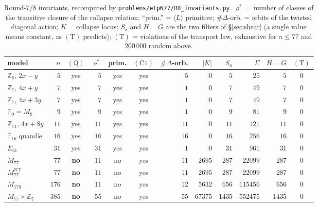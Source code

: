 \documentclass[11pt]{article}
\theoremstyle{plain}
\theoremstyle{definition}
\theoremstyle{remark}
\numberwithin{equation}{section}
\newcommand{\Z}{\mathbb{Z}}
\newcommand{\F}{\mathbb{F}}
\begin{document}
\begin{table}[htbp]
\centering
{\footnotesize
\setlength{\tabcolsep}{4.5pt}
\begin{tabular}{lrcrccrrrrrc}
\toprule
model & $n$ & $(\mathrm{Q})$ & $\varrho^{*}$ & prim. & $(\mathrm{C1})$ &
$\#\Delta$-orb. & $|K|$ & $S_a$ & $\Sigma$ & $H\!=\!G$ & $(\mathrm{T})$\\
\midrule
$\Z_5$, $2x-y$        & $5$   & yes & $5$  & yes & yes & $5$  & $0$    & $5$    & $25$     & $5$    & $0$\\
$\Z_7$, $4x+y$        & $7$   & yes & $7$  & yes & yes & $1$  & $0$    & $7$    & $49$     & $7$    & $0$\\
$\Z_7$, $4x+3y$       & $7$   & yes & $7$  & yes & yes & $1$  & $0$    & $7$    & $49$     & $7$    & $0$\\
$\F_9 = M_9$          & $9$   & yes & $9$  & yes & yes & $1$  & $0$    & $9$    & $81$     & $9$    & $0$\\
$\Z_{11}$, $4x+8y$    & $11$  & yes & $11$ & yes & yes & $11$ & $0$    & $11$   & $121$    & $11$   & $0$\\
$\F_{16}$ quandle     & $16$  & yes & $16$ & yes & yes & $16$ & $0$    & $16$   & $256$    & $16$   & $0$\\
$E_{31}$              & $31$  & yes & $31$ & yes & yes & $1$  & $0$    & $31$   & $961$    & $31$   & $0$\\
$M_{77}$              & $77$  & \textbf{no} & $11$ & no & yes & $11$ & $2695$  & $287$  & $22099$  & $287$  & $0$\\
$M_{77}^{\mathrm{NT}}$& $77$  & \textbf{no} & $11$ & no & yes & $11$ & $2695$  & $287$  & $22099$  & $287$  & $0$\\
$M_{176}$             & $176$ & \textbf{no} & $11$ & no & yes & $12$ & $5632$  & $656$  & $115456$ & $656$  & $0$\\
$M_{77}\times\Z_5$    & $385$ & \textbf{no} & $55$ & no & yes & $55$ & $67375$ & $1435$ & $552475$ & $1435$ & $0$\\
\bottomrule
\end{tabular}}
\caption{Round-7/8 invariants, recomputed by
\texttt{problems/etp677/R8\_invariants.py}. $\varrho^{*}$ = number of classes of
the transitive closure of the collapse relation; ``prim.'' = $\langle L\rangle$
primitive; $\#\Delta$-orb. = orbits of the twisted diagonal action; $K$ = collapse
locus; $S_a$ and $H\!=\!G$ are the two filters of \S\ref{sec:shear} (a single
value means constant, as $(\mathrm{T})$ predicts); $(\mathrm{T})$ = violations of
the transport law, exhaustive for $n\le77$ and $200\,000$ random above.
}
\end{table}
\end{document}
